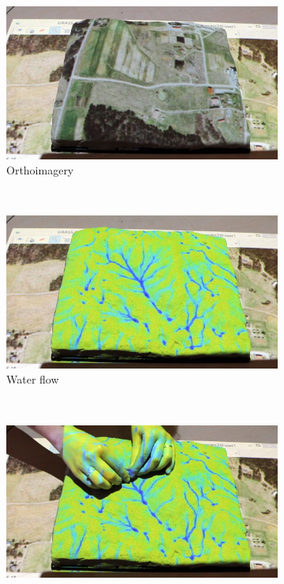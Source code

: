 \documentclass{article}
\begin{document}
\begin{figure}
        \centering
        \begin{subfigure}[b]{0.95\textwidth}
                \includegraphics[width=\textwidth]{images/intro/sequence_0_1}
                \caption{Orthoimagery}
                \label{fig:sequence_0_1}
        \end{subfigure}
        ~ %
        \medskip
        \begin{subfigure}[b]{0.3\textwidth}
                \includegraphics[width=\textwidth]{images/intro/sequence_0_2}
                \caption{Water flow}
                \label{fig:sequence_0_2}
        \end{subfigure}
        ~ %
        \begin{subfigure}[b]{0.3\textwidth}
                \includegraphics[width=\textwidth]{images/intro/sequence_0_3}

\end{subfigure}
\end{figure}
\end{document}
